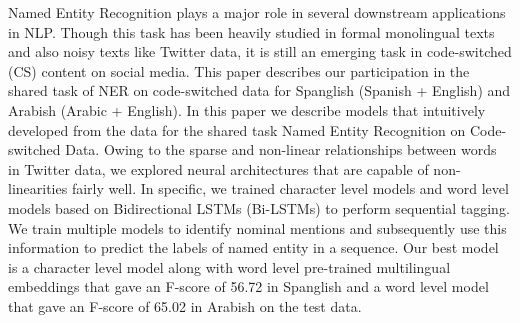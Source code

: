 Named Entity Recognition plays a major role in several downstream applications in NLP. Though this task has been heavily studied in formal monolingual texts and also noisy texts like Twitter data, it is still an emerging task in code-switched (CS) content on social media. This paper describes our participation in the shared task of NER on code-switched data for Spanglish (Spanish + English) and Arabish (Arabic + English). In this paper we describe models that intuitively developed from the data for the shared task Named Entity Recognition on Code-switched Data. Owing to the sparse and non-linear relationships between words in Twitter data, we explored neural architectures that are capable of non-linearities fairly well. In specific, we trained character level models and word level models based on Bidirectional LSTMs (Bi-LSTMs) to perform sequential tagging. We train multiple models to identify nominal mentions and subsequently use this information to predict the labels of named entity in a sequence. Our best model is a character level model along with word level pre-trained multilingual embeddings that gave an F-score of 56.72 in Spanglish and a word level model that gave an F-score of 65.02 in Arabish on the test data.
